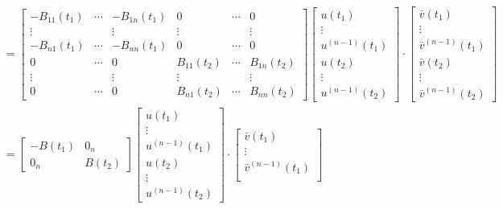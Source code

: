 \documentclass[11pt, oneside, a4paper]{article}
\begin{document}
\begin{rmk}
{\begin{equation}
\begin{split}
        &= \begin{bmatrix}
            -B_{11}(t_1) & \cdots & -B_{1n}(t_1) & 0 & \cdots & 0\\
            \vdots &  & \vdots & \vdots &  & \vdots\\
            -B_{n1}(t_1) & \cdots & -B_{nn}(t_1) & 0 & \cdots & 0\\
            0 & \cdots & 0 & B_{11}(t_2) & \cdots & B_{1n}(t_2)\\
            \vdots &  & \vdots & \vdots &  & \vdots\\
            0 & \cdots & 0 & B_{n1}(t_2) & \cdots & B_{nn}(t_2)
        \end{bmatrix} 
        \begin{bmatrix}
            u(t_1)\\
            \vdots\\
            u^{(n-1)}(t_1)\\
            u(t_2)\\
            \vdots\\
            u^{(n-1)}(t_2)
        \end{bmatrix}\cdot
        \begin{bmatrix}
            \bar{v}(t_1)\\
            \vdots\\
            \bar{v}^{(n-1)}(t_1)\\
            \bar{v}(t_2)\\
            \vdots\\
            \bar{v}^{(n-1)}(t_2)
        \end{bmatrix}\\
        &= \begin{bmatrix}
            -B(t_1) & 0_n\\
            0_n & B(t_2)
        \end{bmatrix}
        \begin{bmatrix}
            u(t_1)\\
            \vdots\\
            u^{(n-1)}(t_1)\\
            u(t_2)\\
            \vdots\\
            u^{(n-1)}(t_2)
        \end{bmatrix}\cdot
        \begin{bmatrix}
            \bar{v}(t_1)\\
            \vdots\\
            \bar{v}^{(n-1)}(t_1)\\

\end{bmatrix}
\end{split}
\end{equation}}
\end{rmk}
\end{document}
